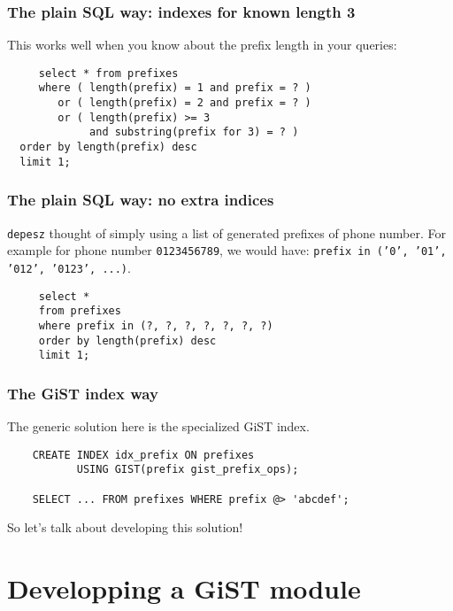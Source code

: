 \documentclass{beamer}
\begin{document}
\begin{frame}[fragile]
  \frametitle{The plain SQL way: indexes for known length 3}

  This works well when you know about the prefix length in your queries:

  \begin{example}
  \begin{verbatim}
     select * from prefixes
     where ( length(prefix) = 1 and prefix = ? )
        or ( length(prefix) = 2 and prefix = ? )
        or ( length(prefix) >= 3 
             and substring(prefix for 3) = ? )
  order by length(prefix) desc
  limit 1;
  \end{verbatim}
  \end{example}
\end{frame}

\begin{frame}[fragile]
  \frametitle{The plain SQL way: no extra indices}

   \texttt{depesz} thought of simply using a list of generated prefixes of
   phone number. For example for phone number \texttt{0123456789}, we would
   have: \texttt{prefix in ('0', '01', '012', '0123', ...)}.

  \begin{example}
  \begin{verbatim}
     select *
     from prefixes
     where prefix in (?, ?, ?, ?, ?, ?, ?)
     order by length(prefix) desc
     limit 1;
  \end{verbatim}
  \end{example}
\end{frame}

\begin{frame}[fragile]
  \frametitle{The GiST index way}

  The generic solution here is the specialized \alert{GiST} index.

  \begin{example}
  \begin{verbatim}
    CREATE INDEX idx_prefix ON prefixes
           USING GIST(prefix gist_prefix_ops);

    SELECT ... FROM prefixes WHERE prefix @> 'abcdef';
  \end{verbatim}
  \end{example}

  So let's talk about developing this solution!
\end{frame}


\section{Developping a GiST module}
\end{document}
